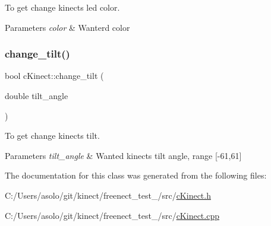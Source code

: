 To get change kinect\textquotesingle{}s led color. 


\begin{DoxyParams}{Parameters}
{\em color} & Wanterd color \\
\hline
\end{DoxyParams}
\mbox{\label{classc_kinect_a729f69cc4f9bfd842775234955f75deb}} 
\subsubsection{\texorpdfstring{change\+\_\+tilt()}{change\_tilt()}}
{\footnotesize\ttfamily bool c\+Kinect\+::change\+\_\+tilt (\begin{DoxyParamCaption}\item[{double}]{tilt\+\_\+angle }\end{DoxyParamCaption})}



To get change kinect\textquotesingle{}s tilt. 


\begin{DoxyParams}{Parameters}
{\em tilt\+\_\+angle} & Wanted kinect\textquotesingle{}s tilt angle, range \mbox{[}-\/61,61\mbox{]} \\
\hline
\end{DoxyParams}


The documentation for this class was generated from the following files\+:\begin{DoxyCompactItemize}
\item 
C\+:/\+Users/asolo/git/kinect/freenect\+\_\+test\+\_/src/\mbox{\hyperlink{c_kinect_8h}{c\+Kinect.\+h}}\item 
C\+:/\+Users/asolo/git/kinect/freenect\+\_\+test\+\_/src/\mbox{\hyperlink{c_kinect_8cpp}{c\+Kinect.\+cpp}}\end{DoxyCompactItemize}
